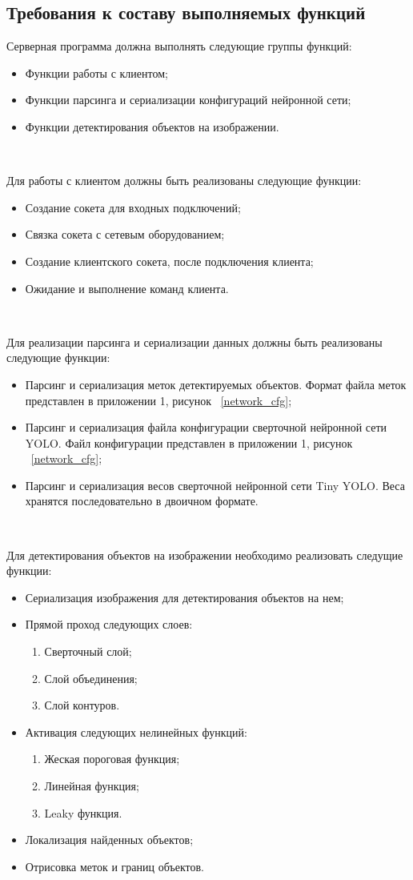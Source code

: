\documentclass[a4paper,english]{G2-105}
\begin{document}
\subsection{Требования к составу выполняемых функций}
\par Серверная программа должна выполнять следующие группы функций:
\begin{itemize}
\item Функции работы с клиентом;
\item Функции парсинга и сериализации конфигураций нейронной сети;
\item Функции детектирования объектов на изображении.
\end{itemize}
~\ 
\par Для работы с клиентом должны быть реализованы следующие функции:
\begin{itemize}
\item Создание сокета для входных подключений;
\item Связка сокета с сетевым оборудованием;
\item Создание клиентского сокета, после подключения клиента;
\item Ожидание и выполнение команд клиента.
\end{itemize}
~\ 
\par Для реализации парсинга и сериализации данных должны быть реализованы следующие функции:
\begin{itemize}
\item Парсинг и сериализация меток детектируемых объектов. Формат файла меток представлен в приложении 1, рисунок ~\ref{network_cfg};
\item Парсинг и сериализация файла конфигурации сверточной нейронной сети YOLO. Файл конфигурации представлен в приложении 1, рисунок ~\ref{network_cfg};
\item Парсинг и сериализация весов сверточной нейронной сети Tiny YOLO. Веса хранятся последовательно в двоичном формате.
\end{itemize}
~\ 
\par Для детектирования объектов на изображении необходимо реализовать следущие функции:
\begin{itemize}
\item Сериализация изображения для детектирования объектов на нем;
\item Прямой проход следующих слоев:
\begin{enumerate}
\item Сверточный слой;
\item Слой объединения;
\item Слой контуров.
\end{enumerate}
\item Активация следующих нелинейных функций:
\begin{enumerate}
\item Жеская пороговая функция;
\item Линейная функция;
\item Leaky функция.
\end{enumerate}
\item Локализация найденных объектов;
\item Отрисовка меток и границ объектов.
\end{itemize}
\end{document}
